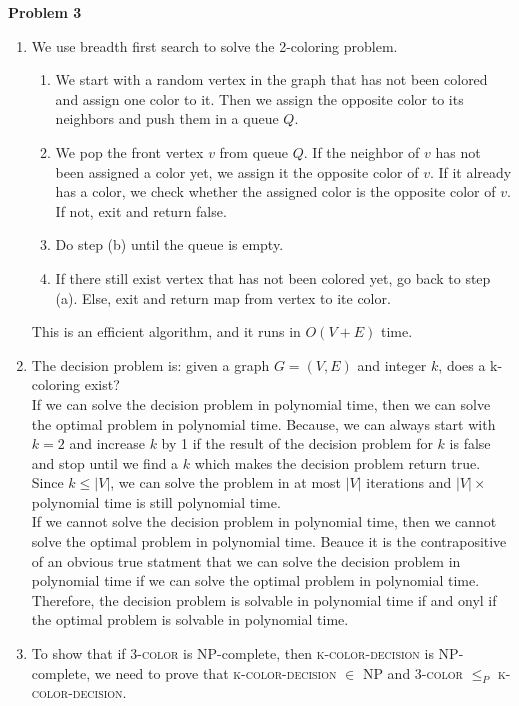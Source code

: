 \documentclass[12pt,letterpaper]{article}
\def\pp{\par\noindent}
\newcommand{\problem}[1]{ \bigskip \pp \textbf{Problem #1}\par}
\begin{document}
\problem{3}
\begin{enumerate}
	\item We use breadth first search to solve the 2-coloring problem.\\
		\begin{enumerate}[itemsep=0mm]
			\item We start with a random vertex in the graph that has not been colored and assign one color to it. Then we assign the opposite color to its neighbors and push them in a queue $Q$.
			\item We pop the front vertex $v$ from queue $Q$. If the neighbor of $v$ has not been assigned a color yet, we assign it the opposite color of $v$. If it already has a color, we check whether the assigned color is the opposite color of $v$. If not, exit and return false.
			\item Do step (b) until the queue is empty.
			\item If there still exist vertex that has not been colored yet, go back to step (a). Else, exit and return map from vertex to ite color. 
		\end{enumerate}
		This is an efficient algorithm, and it runs in $O(V+E)$ time.
	\item
		The decision problem is: given a graph $G=(V,E)$ and integer $k$, does a k-coloring exist?\\
		If we can solve the decision problem in polynomial time, then we can solve the optimal problem in polynomial time. Because, we can always start with $k=2$ and increase $k$ by 1 if the result of the decision problem for $k$ is false and stop until we find a $k$ which makes the decision problem return true. Since $k\leq |V|$, we can solve the problem in at most $|V|$ iterations and $|V| \times$ polynomial time is still polynomial time.\\
		If we cannot solve the decision problem in polynomial time, then we cannot solve the optimal problem in polynomial time. Beauce it is the contrapositive of an obvious true statment that we can solve the decision problem in polynomial time if we can solve the optimal problem in polynomial time.\\
		Therefore, the decision problem is solvable in polynomial time if and onyl if the optimal problem is solvable in polynomial time.
	\item To show that if \textsc{3-color} is NP-complete, then \textsc{k-color-decision} is NP-complete, we need to prove that \textsc{k-color-decision} $\in$ NP and \textsc{3-color} $\leq_P$ \textsc{k-color-decision}.

\end{enumerate}
\end{document}
